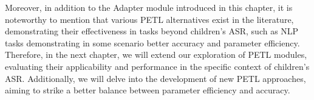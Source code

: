 Moreover, in addition to the Adapter module introduced in this chapter, it is noteworthy to mention that various \ac{PETL} alternatives exist in the literature, demonstrating their effectiveness in tasks beyond children's \ac{ASR}, such as \ac{NLP} tasks demonstrating in some scenario better accuracy and parameter efficiency. Therefore, in the next chapter, we will extend our exploration of \ac{PETL} modules, evaluating their applicability and performance in the specific context of children's \ac{ASR}. Additionally, we will delve into the development of new \ac{PETL} approaches, aiming to strike a better balance between parameter efficiency and accuracy. 


